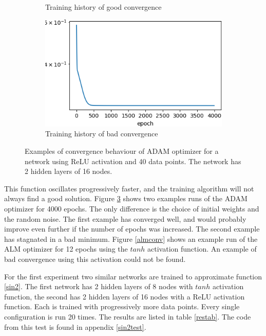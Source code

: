 \begin{figure}[p]
\begin{subfigure}[b]{0.49\textwidth}
         \caption{Training history of good convergence}
         \label{adamgoodconv}
     \end{subfigure}
     \begin{subfigure}[b]{0.49\textwidth}
         \centering
         \includegraphics[width=\textwidth]{adambadconv}
         \caption{Training history of bad convergence}
         \label{adambadconv}
     \end{subfigure}
    \caption{Examples of convergence behaviour of ADAM optimizer for a network using ReLU activation and 40 data points. The network has 2 hidden layers of 16 nodes.}
    \label{adamconv}
\end{figure}

This function oscillates progressively faster, and the training algorithm will not always find a good solution. Figure \ref{adamconv} shows two examples runs of the ADAM optimizer for 4000 epochs. The only difference is the choice of initial weights and the random noise. The first example has converged well, and would probably improve even further if the number of epochs was increased. The second example has stagnated in a bad minimum. Figure \ref{almconv} shows an example run of the ALM optimizer for 12 epochs using the $tanh$ activation function. An example of bad convergence using this activation could not be found.

For the first experiment two similar networks are trained to approximate function \ref{sin2}. The first network has 2 hidden layers of 8 nodes with $tanh$ activation function, the second has 2 hidden layers of 16 nodes with a ReLU activation function. Each is trained with progressively more data points. Every single configuration is run 20 times. The results are listed in table \ref{restab}. The code from this test is found in appendix \ref{sin2test}.

